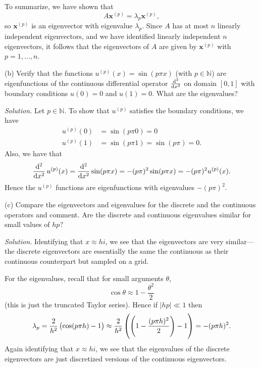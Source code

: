 \documentclass{article}
\def\*#1{\mathbf{#1}}
\newcommand{\N}{\mathbb{N}}
\begin{document}
%
To summarize, we have shown that
%
\begin{equation*}
    A \*x^{(p)} = \lambda_p \*x^{(p)}
    ,
\end{equation*}
%
so $\*x^{(p)}$ is an eigenvector with eigenvalue $\lambda_p$.
Since $A$ has at most $n$ linearly independent eigenvectors,
and we have identified linearly independent $n$ eigenvectors,
it follows that the eigenvectors of $A$ are given by $\*x^{(p)}$ with
$p = 1, \ldots, n$.

\vspace{5mm}

(b) Verify that the functions $u^{(p)}(x) = \sin(p \pi x)$ (with
$p \in \N$) are eigenfunctions of the continuous differential operator
$\od[2]{}{x}$ on domain $[0, 1]$ with boundary conditions
$u(0) = 0$ and $u(1) = 0$. What are the eigenvalues?

\textit{Solution.}
Let $p \in \N$. To show that $u^{(p)}$ satisfies the boundary conditions,
we have
%
\begin{align*}
    u^{(p)}(0) &= \sin(p \pi 0) = 0 \\
    u^{(p)}(1) &= \sin(p \pi 1) = \sin(p \pi) = 0
    .
\end{align*}
%
Also, we have that
%
\begin{equation*}
    \dod[2]{}{x} u^{(p)}(x) = \dod[2]{}{x} \sin(p \pi x) = -(p \pi)^2 \sin(p \pi x) = -(p \pi)^2 u^{(p)}(x)
    .
\end{equation*}
%
Hence the $u^{(p)}$ functions are eigenfunctions with eigenvalues $-(p \pi)^2$.

\vspace{5mm}

(c) Compare the eigenvectors and eigenvalues for the discrete and the
continuous operators and comment. Are the discrete and continuous eigenvalues
similar for small values of $hp$?

\textit{Solution.}
Identifying that $x \approx h i$, we see that the eigenvectors are very
similar---the discrete eigenvectors are essentially the same the continuous
as their continuous counterpart but sampled on a grid.

For the eigenvalues, recall that for small arguments $\theta$,
%
\begin{equation*}
    \cos \theta \approx 1 - \frac{\theta^2}{2}
\end{equation*}
%
(this is just the truncated Taylor series). Hence if $|h p| \ll 1$
then
%
\begin{equation*}
    \lambda_p
        = \frac{2}{h^2} \del{\cos(p \pi h) - 1}
        \approx \frac{2}{h^2} \del{\del{1 - \frac{(p \pi h)^2}{2}} - 1}
        = - (p \pi h)^2
        .
\end{equation*}
%
Again identifying that $x \approx hi$, we see that the eigenvalues
of the discrete eigenvectors are just discretized versions of the
continuous eigenvectors.
\end{document}
